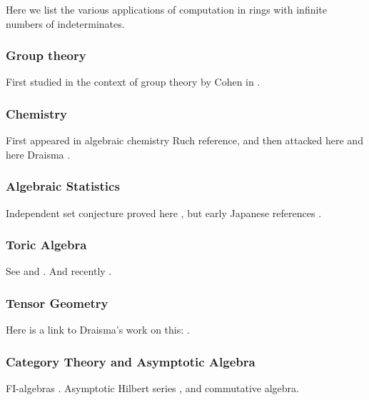 
Here we list the various applications of computation in rings with infinite numbers of indeterminates.  

\subsubsection{Group theory}

First studied in the context of group theory by Cohen in \cite{cohen1967laws}.

\subsubsection{Chemistry}

First appeared in algebraic chemistry \cite{} Ruch reference, and then attacked here \cite{aschenbrenner2007finite} and here Draisma \cite{Draisma08b}.

\subsubsection{Algebraic Statistics}

Independent set conjecture proved here \cite{hillar2012finite}, but early Japanese references \cite{}.

\subsubsection{Toric Algebra}

See \cite{Hillar13, hillar2016corrigendum} and \cite{draisma2013noetherianity}.  And recently \cite{KKL:equivariant-markov}.

\subsubsection{Tensor Geometry}

Here is a link to Draisma's work on this:  \cite{draisma2014bounded}.

\subsubsection{Category Theory and Asymptotic Algebra}

FI-algebras \cite{church2014fi}.  Asymptotic Hilbert series \cite{Nagel}, \cite{krone2016hilbert} and commutative algebra. 